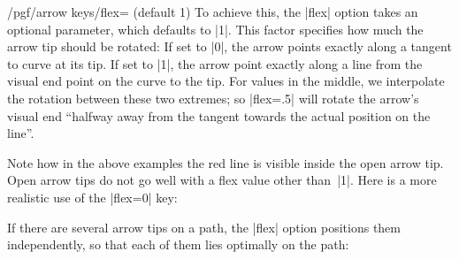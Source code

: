 \begin{key}{/pgf/arrow keys/flex= (default 1)}
    To achieve this, the |flex| option takes an optional 
    parameter, which defaults to |1|. This factor specifies how much the arrow
    tip should be rotated: If set to |0|, the arrow points exactly along a
    tangent to curve at its tip. If set to |1|, the arrow point exactly along a
    line from the visual end point on the curve to the tip. For values in the
    middle, we interpolate the rotation between these two extremes; so
    |flex=.5| will rotate the arrow's visual end ``halfway away from the
    tangent towards the actual position on the line''.
\begin{codeexample}[preamble={\usetikzlibrary{arrows.meta,bending}}]
\end{codeexample}
\begin{codeexample}[preamble={\usetikzlibrary{arrows.meta,bending}}]
\end{codeexample}
    Note how in the above examples the red line is visible inside the open
    arrow tip. Open arrow tips do not go well with a flex value other than~|1|.
    Here is a more realistic use of the |flex=0| key:
\begin{codeexample}[preamble={\usetikzlibrary{arrows.meta,bending}}]
\end{codeexample}
    If there are several arrow tips on a path, the |flex| option positions them
    independently, so that each of them lies optimally on the path:
\begin{codeexample}[preamble={\usetikzlibrary{bending}}]
\end{codeexample}
\end{key}

